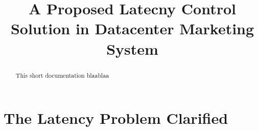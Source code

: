 \documentclass[a4paper,10pt]{article}
\title{A Proposed Latecny Control Solution in Datacenter Marketing System}
\author{}
\begin{document}
\maketitle

\begin{abstract}
This short documentation blaablaa
\end{abstract}

\section{The Latency Problem Clarified}
\end{document}
